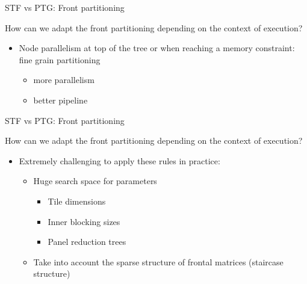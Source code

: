 \documentclass{beamer}
\newcommand{\db}[1]{\textcolor{amblu}{#1}}
\begin{document}
\begin{frame}{STF vs PTG: Front partitioning}
    
    How can we adapt the front partitioning depending on the context of
    execution?

    \begin{itemize}

    \item \db{Node parallelism} at \alert{top of the tree} or when
      \alert{reaching a memory constraint}: fine grain partitioning
      \begin{itemize}
      \item more parallelism
      \item better pipeline
      \end{itemize}
    \end{itemize}      

  \begin{center}
  \end{center}

\end{frame}

\begin{frame}{STF vs PTG: Front partitioning}
    
    How can we adapt the front partitioning depending on the context of
    execution?

    \begin{itemize}
    \item Extremely challenging to apply these rules in practice:
      \begin{itemize}
      \item Huge search space for parameters 
        \begin{itemize}
        \item Tile dimensions
        \item Inner blocking sizes
        \item Panel reduction trees
        \end{itemize}
      \item Take into account the sparse structure of frontal matrices
        (staircase structure)
      \end{itemize}
    \end{itemize}

\end{frame}
\end{document}
